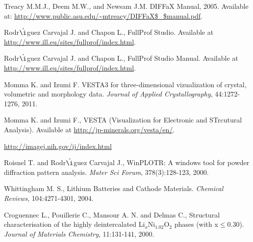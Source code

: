 \begin{thebibliography}{99}
 Treacy M.M.J., Deem M.W., and Newsam J.M. DIFFaX Manual, 2005. Available at: \url{http://www.public.asu.edu/~mtreacy/DIFFaX$\_$manual.pdf}. 

 Rodr$\acute{\i}$guez Carvajal J. and Chapon L., FullProf Studio. Available at \url{http://www.ill.eu/sites/fullprof/index.html}.

 Rodr$\acute{\i}$guez Carvajal J. and Chapon L., FullProf Studio Manual. Available at \url{http://www.ill.eu/sites/fullprof/index.html}.

 Momma K. and Izumi F. VESTA3 for three-dimensional vizualization of crystal, volumetric and morphology data. \textit{Journal of Applied Crystallography}, 44:1272-1276, 2011.

 Momma K. and Izumi F., VESTA (Visualization for Electronic and STrcutural Analysis). Available at \url{http://jp-minerals.org/vesta/en/}.

 \url{http://imagej.nih.gov/ij/index.html}

 Roisnel T. and Rodr$\acute{\i}$guez Carvajal J., WinPLOTR: A windows tool for powder diffraction pattern analysis. \textit{Mater Sci Forum}, 378(3):128-123, 2000.

 Whittingham M. S., Lithium Batteries and Cathode Materials. \textit{Chemical Reviews}, 104:4271-4301, 2004. 

 Croguennec L., Pouillerie C., Mansour A. N. and Delmas C., Structural characterisation of the highly deintercalated Li$_{x}$Ni$_{1.02}$O$_{2}$ phases (with x$\leq$0.30). \textit{Journal of Materials Chemistry}, 11:131-141, 2000.



\end{thebibliography}

